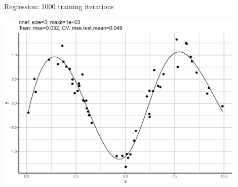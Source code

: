 \begin{frame}{Regression: 1000 training iterations}
{\begin{center}
\includegraphics[width=0.9\textwidth]{plots/reg-n3.png}
\end{center}

}


\end{frame}
